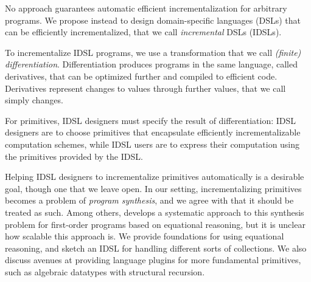 

No approach guarantees automatic efficient incrementalization for arbitrary
programs.
We propose instead to design domain-specific languages
(DSLs) that can be efficiently incrementalized, that we call \emph{incremental}
DSLs (IDSLs).

To incrementalize IDSL programs, we use a transformation that we call
\emph{(finite) differentiation}.
Differentiation produces programs in the same language, called derivatives,
that can be optimized further and compiled to efficient code.
Derivatives represent changes to values through further values, that we call
simply changes.

For primitives, IDSL designers must specify the result of
differentiation: IDSL designers are to choose primitives that encapsulate
efficiently incrementalizable computation schemes, while IDSL users are to
express their computation using the primitives provided by the IDSL\@.

Helping IDSL designers to incrementalize primitives automatically is a
desirable goal, though one that we leave open. In our setting, incrementalizing
primitives becomes a problem of \emph{program synthesis}, and we agree with
\citet{Shah2017synthesis} that it should be treated as such. Among others,
\citet{Liu00} develops a systematic approach to this synthesis problem for
first-order programs based on equational reasoning, but it is unclear how
scalable this approach is. We provide foundations for using equational
reasoning, and sketch an IDSL for handling different sorts of collections. We
also discuss avenues at providing language plugins for more fundamental
primitives, such as algebraic datatypes with structural recursion.

